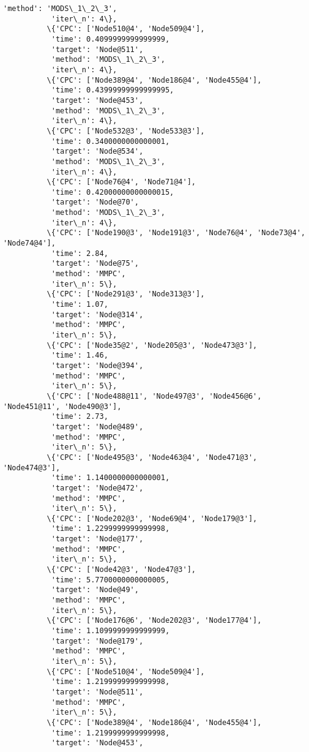 \documentclass[11pt]{article}
\begin{document}
\begin{Verbatim}[commandchars=\\\{\}]
           'method': 'MODS\_1\_2\_3',
           'iter\_n': 4\},
          \{'CPC': ['Node510@4', 'Node509@4'],
           'time': 0.4099999999999999,
           'target': 'Node@511',
           'method': 'MODS\_1\_2\_3',
           'iter\_n': 4\},
          \{'CPC': ['Node389@4', 'Node186@4', 'Node455@4'],
           'time': 0.43999999999999995,
           'target': 'Node@453',
           'method': 'MODS\_1\_2\_3',
           'iter\_n': 4\},
          \{'CPC': ['Node532@3', 'Node533@3'],
           'time': 0.3400000000000001,
           'target': 'Node@534',
           'method': 'MODS\_1\_2\_3',
           'iter\_n': 4\},
          \{'CPC': ['Node76@4', 'Node71@4'],
           'time': 0.42000000000000015,
           'target': 'Node@70',
           'method': 'MODS\_1\_2\_3',
           'iter\_n': 4\},
          \{'CPC': ['Node190@3', 'Node191@3', 'Node76@4', 'Node73@4', 'Node74@4'],
           'time': 2.84,
           'target': 'Node@75',
           'method': 'MMPC',
           'iter\_n': 5\},
          \{'CPC': ['Node291@3', 'Node313@3'],
           'time': 1.07,
           'target': 'Node@314',
           'method': 'MMPC',
           'iter\_n': 5\},
          \{'CPC': ['Node35@2', 'Node205@3', 'Node473@3'],
           'time': 1.46,
           'target': 'Node@394',
           'method': 'MMPC',
           'iter\_n': 5\},
          \{'CPC': ['Node488@11', 'Node497@3', 'Node456@6', 'Node451@11', 'Node490@3'],
           'time': 2.73,
           'target': 'Node@489',
           'method': 'MMPC',
           'iter\_n': 5\},
          \{'CPC': ['Node495@3', 'Node463@4', 'Node471@3', 'Node474@3'],
           'time': 1.1400000000000001,
           'target': 'Node@472',
           'method': 'MMPC',
           'iter\_n': 5\},
          \{'CPC': ['Node202@3', 'Node69@4', 'Node179@3'],
           'time': 1.2299999999999998,
           'target': 'Node@177',
           'method': 'MMPC',
           'iter\_n': 5\},
          \{'CPC': ['Node42@3', 'Node47@3'],
           'time': 5.7700000000000005,
           'target': 'Node@49',
           'method': 'MMPC',
           'iter\_n': 5\},
          \{'CPC': ['Node176@6', 'Node202@3', 'Node177@4'],
           'time': 1.1099999999999999,
           'target': 'Node@179',
           'method': 'MMPC',
           'iter\_n': 5\},
          \{'CPC': ['Node510@4', 'Node509@4'],
           'time': 1.2199999999999998,
           'target': 'Node@511',
           'method': 'MMPC',
           'iter\_n': 5\},
          \{'CPC': ['Node389@4', 'Node186@4', 'Node455@4'],
           'time': 1.2199999999999998,
           'target': 'Node@453',

\end{Verbatim}
\end{document}
